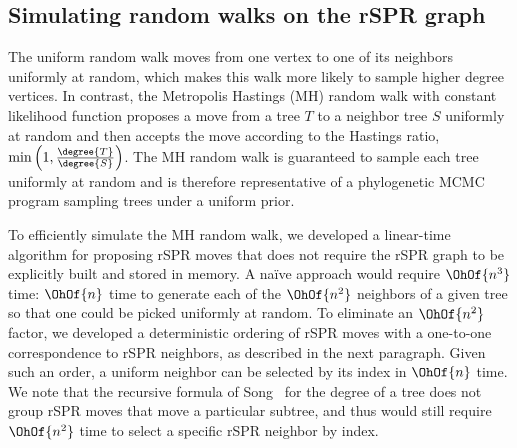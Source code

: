 \documentclass[11pt,onecolumn,conference]{IEEEtran}
\begin{document}
\subsection{Simulating random walks on the rSPR graph}
\label{sec:random_walks}
The uniform random walk moves from one vertex to one of its neighbors uniformly at random, which makes this walk more likely to sample higher degree vertices.
In contrast, the Metropolis Hastings (MH) random walk with constant likelihood function proposes a move from a tree $T$ to a neighbor tree $S$ uniformly at random and then accepts the move according to the Hastings ratio, $\min\left(1, \frac{\degree{T}}{\degree{S}}\right)$.
The MH random walk is guaranteed to sample each tree uniformly at random and is therefore representative of a phylogenetic MCMC program sampling trees under a uniform prior.

To efficiently simulate the MH random walk, we developed a linear-time algorithm for proposing rSPR moves that does not require the rSPR graph to be explicitly built and stored in memory.
A na\"ive approach would require $\OhOf{n^3}$ time: $\OhOf{n}$ time to generate each of the $\OhOf{n^2}$ neighbors of a given tree so that one could be picked uniformly at random.
To eliminate an $\OhOf{n^2}$ factor, we developed a deterministic ordering of rSPR moves with a one-to-one correspondence to rSPR neighbors, as described in the next paragraph.
Given such an order, a uniform neighbor can be selected by its index in $\OhOf{n}$ time.
We note that the recursive formula of Song~\cite{Song2003-gf} for the degree of a tree does not group rSPR moves that move a particular subtree, and thus would still require $\OhOf{n^2}$ time to select a specific rSPR neighbor by index.
\end{document}
